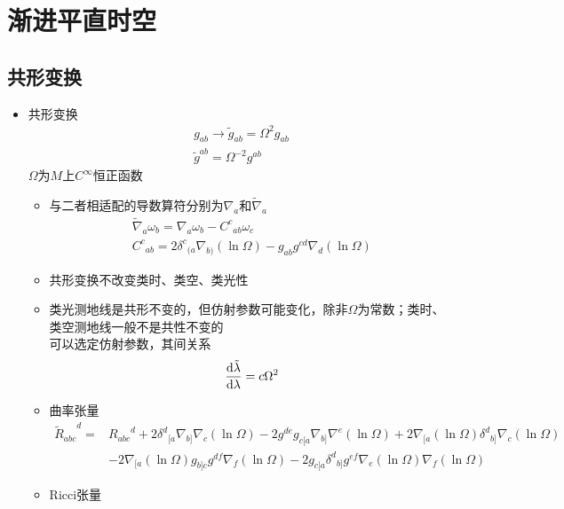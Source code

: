 \chapter{渐进平直时空}

\section{共形变换}

\begin{itemize}
    \item 共形变换
    \begin{gather*}
        g_{ab} \to \tilde{g}_{ab} = \Omega^2 g_{ab}
        \\
        \tilde{g}^{ab} = \Omega^{-2} g^{ab}
    \end{gather*}
    $\Omega$为$M$上$C^{\infty}$恒正函数
    \begin{itemize}
        \item 与二者相适配的导数算符分别为$\nabla_a$和$\tilde{\nabla}_a$
        \begin{gather*}
            \tilde{\nabla}_a \omega_b = \nabla_a \omega_b - {C^c}_{ab} \omega_c
            \\
            {C^c}_{ab} = 2 {\delta^c}_{(a} \nabla_{b)} (\ln \Omega) - g_{ab} g^{cd} \nabla_d (\ln \Omega)
        \end{gather*}
        \item 共形变换不改变类时、类空、类光性
        \item 类光测地线是共形不变的，但仿射参数可能变化，除非$\Omega$为常数；类时、类空测地线一般不是共性不变的\\
        可以选定仿射参数，其间关系
        \begin{gather*}
            \frac{\mathrm{d} \tilde{\lambda}}{\mathrm{d} \lambda} = c \Omega^2
        \end{gather*}
        \item 曲率张量
        \begin{align*}
            {\tilde{R}_{abc}}^d=&{R_{abc}}^d + 2 {\delta^d}_{[a} \nabla_{b]} \nabla_c (\ln \Omega) - 2 g^{de} g_{c[a} \nabla_{b]} \nabla^e (\ln \Omega) + 2 \nabla_{[a} (\ln \Omega) {\delta^d}_{b]} \nabla_c (\ln \Omega) 
            \\
            &- 2 \nabla_{[a} (\ln \Omega) g_{b]c} g^{df} \nabla_f (\ln \Omega) - 2 g_{c[a} {\delta^d}_{b]} g^{ef} \nabla_e (\ln \Omega) \nabla_f (\ln \Omega)
        \end{align*}
        \item Ricci张量
        \begin{align*}

\end{align*}
\end{itemize}
\end{itemize}
